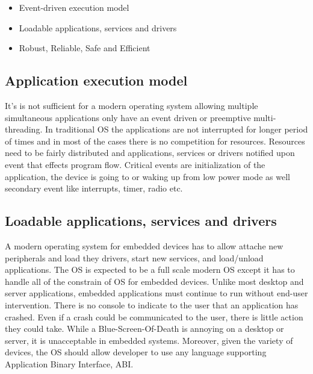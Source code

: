 \begin{itemize}
  \item Event-driven execution model
  \item Loadable applications, services and drivers
  \item Robust, Reliable, Safe and Efficient 
\end{itemize}

\subsection{Application execution model}
It's is not sufficient for a modern operating system allowing multiple
simultaneous applications only have an event driven or preemptive
multi-threading. In traditional OS the applications are not interrupted for
longer period of times and in most of the cases there is no competition for
resources. Resources need to be fairly distributed and applications, services or
drivers notified upon event that effects program flow. Critical events are
initialization of the application, the device is going to or waking up from low
power mode as well secondary event like interrupts, timer, radio etc.

\subsection{Loadable applications, services and drivers}
A modern operating system for embedded devices has to allow attache new
peripherals and load they drivers, start new services, and load/unload
applications. The OS is expected to be a full scale modern OS except it has to
handle all of the constrain of OS for embedded devices. Unlike most desktop and
server applications, embedded applications must continue to run without end-user
intervention. There is no console to indicate to the user that an application
has crashed. Even if a crash could be communicated to the user, there is little
action they could take. While a Blue-Screen-Of-Death is annoying on a desktop or
server, it is unacceptable in embedded systems. Moreover, given the variety of
devices, the OS should allow developer to use any language supporting
Application Binary Interface, ABI.

